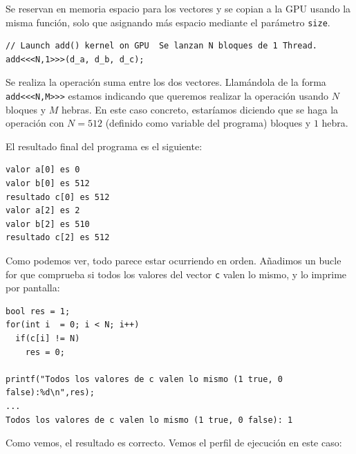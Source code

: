 \documentclass[11pt]{article}
\def\inline{\lstinline[basicstyle=\ttfamily,keywordstyle={}]}
\theoremstyle{plain}
\begin{document}
Se reservan en memoria espacio para los vectores y se copian a la GPU usando la misma función, solo que asignando más espacio mediante el parámetro \inline{size}.

\begin{verbatim}
// Launch add() kernel on GPU  Se lanzan N bloques de 1 Thread.
add<<<N,1>>>(d_a, d_b, d_c);
\end{verbatim}

Se realiza la operación suma entre los dos vectores. Llamándola de la forma \inline{add<<<N,M>>>} estamos indicando que queremos realizar la operación usando $N$ bloques y $M$ hebras. En este caso concreto, estaríamos diciendo que se haga la operación con $N = 512$ (definido como variable del programa) bloques y $1$ hebra.

El resultado final del programa es el siguiente:

\begin{verbatim}
valor a[0] es 0
valor b[0] es 512
resultado c[0] es 512
valor a[2] es 2
valor b[2] es 510
resultado c[2] es 512	
\end{verbatim}

Como podemos ver, todo parece estar ocurriendo en orden. Añadimos un bucle for que comprueba si todos los valores del vector \inline{c} valen lo mismo, y lo imprime por pantalla:

\begin{verbatim}
bool res = 1;
for(int i  = 0; i < N; i++)
  if(c[i] != N)
	res = 0;

printf("Todos los valores de c valen lo mismo (1 true, 0 false):%d\n",res);
... 
Todos los valores de c valen lo mismo (1 true, 0 false): 1
\end{verbatim}

Como vemos, el resultado es correcto. Vemos el perfil de ejecución en este caso:
\end{document}
